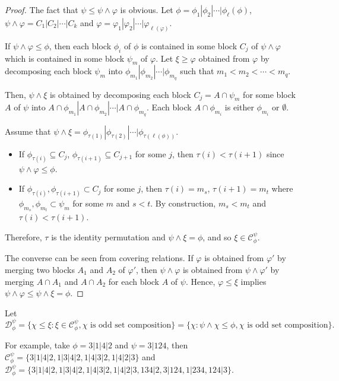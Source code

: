 \documentclass[11pt]{amsart}
\numberwithin{equation}{section}
\begin{document}
\begin{proof}
	The fact that $\psi\leq\psi\land\varphi$ is obvious. Let $\phi=\phi_1|\phi_2|\cdots|\phi_\ell(\phi)$, $\psi\land\varphi=C_1|C_2|\cdots|C_k$ and $\varphi=\varphi_1|\varphi_2|\cdots|\varphi_{\ell(\varphi)}$.

	If $\psi\land\varphi\leq\phi$, then each block $\phi_i$ of $\phi$ is contained in some block $C_j$ of $\psi\land\varphi$ which is contained in some block $\psi_m$ of $\varphi$. Let $\xi\geq\varphi$ obtained from $\varphi$ by decomposing each block $\psi_m$ into $\phi_{m_1}|\phi_{m_2}|\cdots|\phi_{m_q}$ such that $m_1<m_2<\cdots<m_q$.
	
	Then, $\psi\land\xi$ is obtained by decomposing each block $C_j=A\cap \psi_m$ for some block $A$ of $\psi$ into $A\cap \phi_{m_1}|A\cap \phi_{m_2}|\cdots|A\cap \phi_{m_q}$. Each block $A\cap \phi_{m_i}$ is either $\phi_{m_i}$ or $\emptyset$.
	
	Assume that $\psi\land\xi=\phi_{\tau(1)}|\phi_{\tau(2)}|\cdots|\phi_{\tau(\ell(\phi))}.$
	\begin{itemize}
		\item If $\phi_{\tau(i)}\subseteq C_j$, $\phi_{\tau(i+1)}\subseteq C_{j+1}$ for some $j$, then $\tau(i)<\tau(i+1)$ since $\psi\land\varphi\leq\phi$.
		\item If $\phi_{\tau(i)},\phi_{\tau(i+1)}\subset C_j$ for some $j$, then $\tau(i)=m_s$, $\tau(i+1)=m_t$ where $\phi_{m_s},\phi_{m_t}\subset \psi_m$ for some $m$ and $s<t$. By construction, $m_s<m_t$ and $\tau(i)<\tau(i+1)$.
	\end{itemize}
	Therefore, $\tau$ is the identity permutation and $\psi\land\xi=\phi$, and so $\xi\in\mathscr{C}_\phi^\psi$.
	
	The converse can be seen from covering relations. If $\varphi$ is obtained from $\varphi'$ by merging two blocks $A_1$ and $A_2$ of $\varphi'$, then $\psi\land\varphi$ is obtained from $\psi\land\varphi'$ by merging $A\cap A_1$ and $A\cap A_2$ for each block $A$ of $\psi$. Hence, $\varphi\leq\xi$ implies $\psi\land\varphi\leq\psi\land\xi=\phi$.
\end{proof}


Let $$\mathscr{D}_\phi^\psi = \{\chi\leq\xi:\xi\in\mathscr{C}_\phi^\psi,\chi\text{ is odd set composition}\}=\{\chi:\psi\land\chi\leq\phi,\chi\text{ is odd set composition}\}.$$

For example, take $\phi=3|1|4|2$ and $\psi=3|124$, then $\mathscr{C}_\phi^\psi=\{3|1|4|2,1|3|4|2,1|4|3|2,1|4|2|3\}$ and $\mathscr{D}_\phi^\psi=\{3|1|4|2,1|3|4|2,1|4|3|2,1|4|2|3,134|2,3|124,1|234,124|3\}$.
\end{document}

